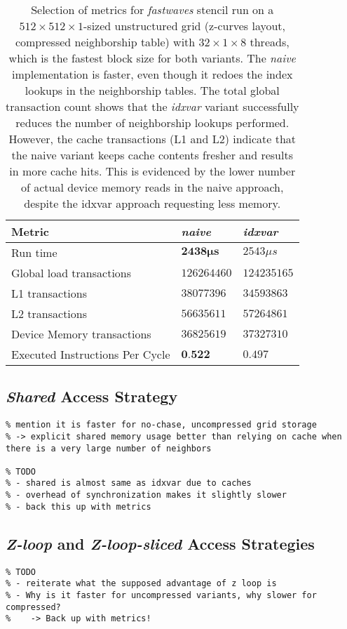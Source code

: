 \begin{table}
	\begin{tabular}{l l l}
		\hline
		Metric & \emph{naive} & \emph{idxvar} \\
		\hline
		Run time & $\mathbf{2438\mu s}$ & $2543\mu s$ \\
		Global load transactions & $126264460$ & $124235165$ \\
		L1 transactions & $38077396$ & $34593863$ \\
		L2 transactions & $56635611$ & $57264861$ \\
		Device Memory transactions & $36825619$ & $37327310$ \\
		Executed Instructions Per Cycle & $\textbf{0.522}$ & $0.497$ \\
		\hline
	\end{tabular}
	\caption{\label{tab:fastwaves-naive-idxvar-metrics}Selection of metrics for \emph{fastwaves} stencil run on a $512\times 512\times 1$-sized unstructured grid (z-curves layout, compressed neighborship table) with $32\times 1\times 8$ threads, which is the fastest block size for both variants. The \emph{naive} implementation is faster, even though it redoes the index lookups in the neighborship tables. The total global transaction count shows that the \emph{idxvar} variant successfully reduces the number of neighborship lookups performed. However, the cache transactions (L1 and L2) indicate that the naive variant keeps cache contents fresher and results in more cache hits. This is evidenced by the lower number of actual device memory reads in the naive approach, despite the idxvar approach requesting less memory.}
\end{table}

\subsection{\emph{Shared} Access Strategy}

\begin{verbatim}
% mention it is faster for no-chase, uncompressed grid storage
% -> explicit shared memory usage better than relying on cache when there is a very large number of neighbors

% TODO
% - shared is almost same as idxvar due to caches
% - overhead of synchronization makes it slightly slower
% - back this up with metrics
\end{verbatim}

\subsection{\emph{Z-loop} and \emph{Z-loop-sliced} Access Strategies}

\begin{verbatim}
% TODO
% - reiterate what the supposed advantage of z loop is
% - Why is it faster for uncompressed variants, why slower for compressed?
%    -> Back up with metrics!
\end{verbatim}
